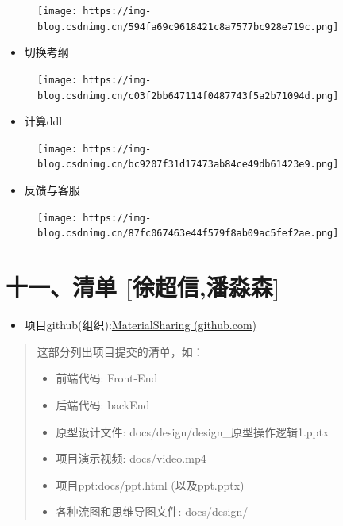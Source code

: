 \documentclass[
]{article}
\begin{document}
\begin{figure}
\centering
\texttt{[image: https://img-blog.csdnimg.cn/594fa69c9618421c8a7577bc928e719c.png]}
\caption{}
\end{figure}

\begin{itemize}
\item
  切换考纲
\end{itemize}

\begin{figure}
\centering
\texttt{[image: https://img-blog.csdnimg.cn/c03f2bb647114f0487743f5a2b71094d.png]}
\caption{}
\end{figure}

\begin{itemize}
\item
  计算ddl
\end{itemize}

\begin{figure}
\centering
\texttt{[image: https://img-blog.csdnimg.cn/bc9207f31d17473ab84ce49db61423e9.png]}
\caption{}
\end{figure}

\begin{itemize}
\item
  反馈与客服
\end{itemize}

\begin{figure}
\centering
\texttt{[image: https://img-blog.csdnimg.cn/87fc067463e44f579f8ab09ac5fef2ae.png]}
\caption{}
\end{figure}

\hypertarget{ux5341ux4e00ux6e05ux5355-ux5f90ux8d85ux4fe1ux6f58ux6dfcux68ee}{%
\section{十一、清单
{[}徐超信,潘淼森{]}}\label{ux5341ux4e00ux6e05ux5355-ux5f90ux8d85ux4fe1ux6f58ux6dfcux68ee}}

\begin{itemize}
\item
  项目github(组织):\href{https://github.com/MaterialSharing}{MaterialSharing
  (github.com)}
\end{itemize}

\begin{quote}
这部分列出项目提交的清单，如：

\begin{itemize}
\item
  前端代码: Front-End
\item
  后端代码: backEnd
\item
  原型设计文件: docs/design/design\_原型操作逻辑1.pptx
\item
  项目演示视频: docs/video.mp4
\item
  项目ppt:docs/ppt.html (以及ppt.pptx)
\item
  各种流图和思维导图文件: docs/design/
\end{itemize}
\end{quote}
\end{document}
